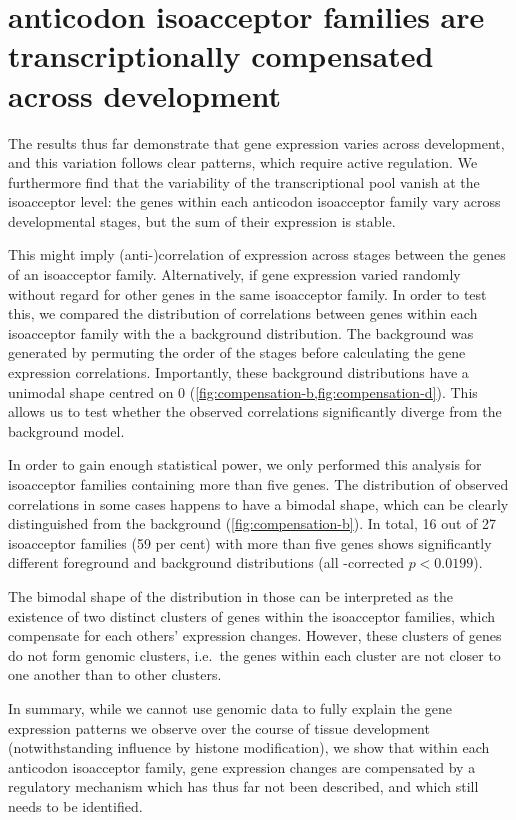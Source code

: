 \section{\trna anticodon isoacceptor families are transcriptionally compensated
across development}

The results thus far demonstrate that \trna gene expression varies across
development, and this variation follows clear patterns, which require active
regulation. We furthermore find that the variability of the transcriptional
\trna pool vanish at the isoacceptor level: the \trna genes within each
anticodon isoacceptor family vary across developmental stages, but the sum of
their expression is stable.

This might imply (anti-)correlation of expression across stages between the
genes of an isoacceptor family. Alternatively, if \trna gene expression varied
randomly without regard for other \trna genes in the same isoacceptor family. In
order to test this, we compared the distribution of correlations between genes
within each isoacceptor family with the a background distribution. The
background was generated by permuting the order of the stages before calculating
the \trna gene expression correlations. Importantly, these background
distributions have a unimodal shape centred on \num{0}
(\cref{fig:compensation-b,fig:compensation-d}). This allows us to test whether
the observed correlations significantly diverge from the background model.

In order to gain enough statistical power, we only performed this analysis for
\trna isoacceptor families containing more than five genes. The distribution
of observed correlations in some cases happens to have a bimodal shape, which
can be clearly distinguished from the background (\cref{fig:compensation-b}). In
total, \num{16} out of \num{27} isoacceptor families (\num{59} per cent) with
more than five genes shows significantly different foreground and background
distributions (all \fdr-corrected \(p < 0.0199\)).

The bimodal shape of the distribution in those can be interpreted as the
existence of two distinct clusters of \trna genes within the isoacceptor
families, which compensate for each others’ expression changes. However, these
clusters of genes do not form genomic clusters, i.e.\ the \trna genes within
each cluster are not closer to one another than to other clusters.

In summary, while we cannot use genomic data to fully explain the \trna gene
expression patterns we observe over the course of tissue development
(notwithstanding influence by histone modification), we show that within each
anticodon isoacceptor family, \trna gene expression changes are compensated by
a regulatory mechanism which has thus far not been described, and which still
needs to be identified.

